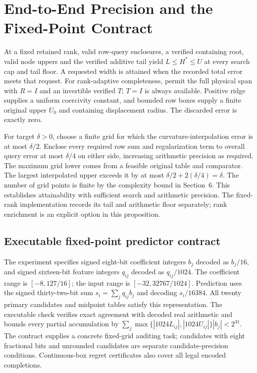 \section{End-to-End Precision and the Fixed-Point Contract}\label{app:complete-v91}
At a fixed retained rank, valid row-query enclosures, a verified containing root, valid node uppers and the verified additive tail yield $L\le H^*\le U$ at every search cap and tail floor. A requested width is attained when the recorded total error meets that request. For rank-adaptive completeness, permit the full physical span with $R=I$ and an invertible verified $T$; $T=I$ is always available. Positive ridge supplies a uniform coercivity constant, and bounded row boxes supply a finite original upper $U_0$ and containing displacement radius. The discarded error is exactly zero.

For target $\delta>0$, choose a finite grid for which the curvature-interpolation error is at most $\delta/2$. Enclose every required row sum and regularization term to overall query error at most $\delta/4$ on either side, increasing arithmetic precision as required. The maximum grid lower comes from a feasible original table and comparator. The largest interpolated upper exceeds it by at most $\delta/2+2(\delta/4)=\delta$. The number of grid points is finite by the complexity bound in Section~6. This establishes attainability with sufficient search and arithmetic precision. The fixed-rank implementation records its tail and arithmetic floor separately; rank enrichment is an explicit option in this proposition.

\subsection{Executable fixed-point predictor contract}\label{app:fixed-point-v91}
The experiment specifies signed eight-bit coefficient integers $b_j$ decoded as $b_j/16$, and signed sixteen-bit feature integers $q_{ij}$ decoded as $q_{ij}/1024$. The coefficient range is $[-8,127/16]$; the input range is $[-32,32767/1024]$. Prediction uses the signed thirty-two-bit sum $s_i=\sum_jq_{ij}b_j$ and decoding $s_i/16384$. All twenty primary candidates and midpoint tables satisfy this representation. The executable check verifies exact agreement with decoded real arithmetic and bounds every partial accumulation by $\sum_j\max\{|1024L_{ij}|,|1024U_{ij}|\}|b_j|<2^{31}$. The contract supplies a concrete fixed-grid auditing task; candidates with eight fractional bits and unrounded candidates are separate candidate-precision conditions. Continuous-box regret certificates also cover all legal encoded completions.


